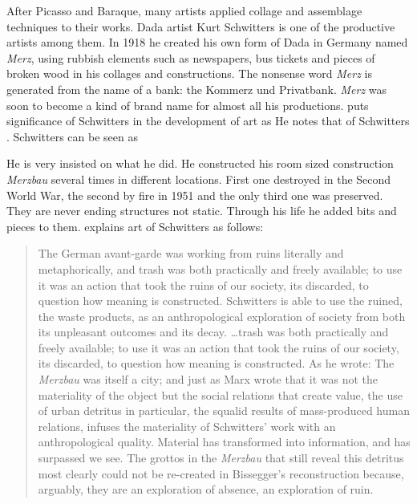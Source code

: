 After Picasso and Baraque, many artists applied collage and assemblage techniques to their works. Dada artist Kurt Schwitters is one of the productive artists among them. In 1918 he created his own form of Dada in Germany named \textit{Merz}, using rubbish elements such as newspapers, bus tickets and pieces of broken wood in his collages and constructions. The nonsense word \textit{Merz} is generated from the name of a bank: the Kommerz und Privatbank. \textit{Merz} was soon to become a kind of brand name for almost all his productions. \cite{webster2011kurt} puts significance of Schwitters in the development of art as  He notes that  of Schwitters . Schwitters can be seen as 

He is very insisted on what he did. He constructed his room sized construction \textit{Merzbau} several times in different locations. First one destroyed in the Second World War, the second by fire in 1951 and the only third one was preserved. They are never ending structures not static. Through his life he added bits and pieces to them. \cite{carroll2011ruin} explains art of Schwitters as follows:

\begin{quote}
The German avant-garde was working from ruins literally and metaphorically, and trash was both practically and freely available; to use it was an action that took the ruins of our society, its discarded, to question how meaning is constructed. Schwitters is able to use the ruined, the waste products, as an anthropological exploration of society from both its unpleasant outcomes and its decay. \ldots trash was both practically and freely available; to use it was an action that took the ruins of our society, its discarded, to question how meaning is constructed. As he wrote:  The \textit{Merzbau} was itself a city; and just as Marx wrote that it was not the materiality of the object but the social relations that create value, the use of urban detritus in particular, the squalid results of mass-produced human relations, infuses the materiality of Schwitters’ work with an anthropological quality. Material has transformed into information, and  has surpassed  we see. The grottos in the \textit{Merzbau} that still reveal this detritus most clearly could not be re-created in Bissegger’s reconstruction because, arguably, they are an exploration of absence, an exploration of ruin.
\end{quote}

